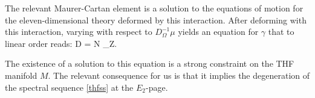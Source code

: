 The relevant Maurer-Cartan element is a solution to the equations of motion for the eleven-dimensional theory deformed by this interaction. After deforming with this interaction, varying with respect to $D_{\Omega}^{-1}\mu$ yields an equation for $\gamma$ that to linear order reads:
\beqn
\thfd D \gamma  = N \delta_Z.
\eeqn

The existence of a solution to this equation is a strong constraint on the THF manifold $M$. The relevant consequence for us is that it implies the degeneration of the spectral sequence \ref{thfss} at the $E_{2}$-page.






